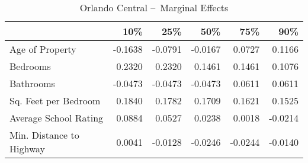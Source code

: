 \begin{table}[H]
\centering
\begin{tabular}{lrrrrr}
\toprule
 & 10\% & 25\% & 50\% & 75\% & 90\% \\
\midrule
Age of Property & -0.1638 & -0.0791 & -0.0167 & 0.0727 & 0.1166 \\
Bedrooms & 0.2320 & 0.2320 & 0.1461 & 0.1461 & 0.1076 \\
Bathrooms & -0.0473 & -0.0473 & -0.0473 & 0.0611 & 0.0611 \\
Sq. Feet per Bedroom & 0.1840 & 0.1782 & 0.1709 & 0.1621 & 0.1525 \\
Average School Rating & 0.0884 & 0.0527 & 0.0238 & 0.0018 & -0.0214 \\
Min. Distance to Highway & 0.0041 & -0.0128 & -0.0246 & -0.0244 & -0.0140 \\
\bottomrule
\end{tabular}
\caption{Orlando Central – Marginal Effects}
\label{tab:orlando_central_marginal}
\end{table}
